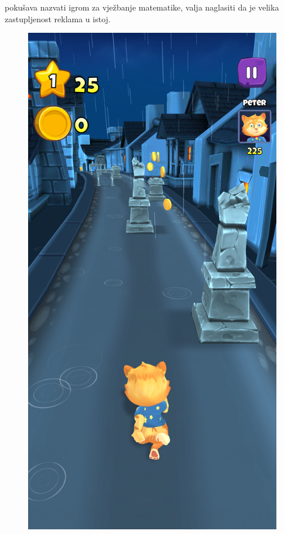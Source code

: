 \documentclass[times, utf8, zavrsni, numeric]{fer}
\begin{document}
	 pokušava nazvati igrom za vježbanje matematike, valja naglasiti da je velika zastupljenost reklama u istoj. \begin{figure}[!htb]
		\begin{minipage}{0.48\textwidth}
			\centering
			\includegraphics[scale=0.15]{"slike/igre/toonmath1.png"} 

\end{minipage}
\end{figure}
\end{document}
